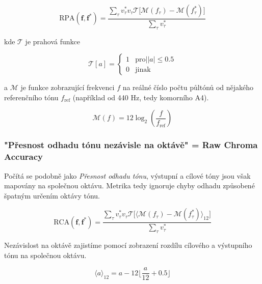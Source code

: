     $$\mathrm{RPA}(\mathbf{f}, \mathbf{f^*}) = \frac{\sum_\tau{v^*_\tau v_\tau \mathcal{T}[\mathcal{M}(f_\tau) - \mathcal{M}(f^*_\tau)}] }{\sum_\tau{v^*_\tau}}$$

kde $\mathcal{T}$ je prahová funkce

    \begin{equation*}
        \mathcal{T}[a] = \begin{cases}
                1 & \mathrm{pro} \lvert |a| \le 0.5 \\
                0 & \text{jinak}
                
            \end{cases}
    \end{equation*}

a $\mathcal{M}$ je funkce zobrazující frekvenci $f$ na reálné číslo počtu půltónů od nějakého referenčního tónu $f_{\mathrm{ref}}$ (například od 440 Hz, tedy komorního A4).

    $$\mathcal{M}(f) = 12 \log_2(\frac{f}{f_{\mathrm{ref}}})$$





\subsubsection{"Přesnost odhadu tónu nezávisle na oktávě" = Raw Chroma Accuracy}

Počítá se podobně jako \textit{Přesnost odhadu tónu}, výstupní a cílové tóny jsou však mapovány na společnou oktávu. Metrika tedy ignoruje chyby odhadu způsobené špatným určením oktávy tónu.

    $$\mathrm{RCA}(\mathbf{f}, \mathbf{f^*}) = \frac{\sum_\tau{v^*_\tau v_\tau \mathcal{T}[\langle \mathcal{M}(f_\tau) - \mathcal{M}(f^*_\tau)} \rangle_{12}] }{\sum_\tau{v^*_\tau}}$$

Nezávislost na oktávě zajistíme pomocí zobrazení rozdílu cílového a výstupního tónu na společnou oktávu.

    $$\langle a \rangle_{12} = a - 12 \lfloor \frac{a}{12} + 0.5 \rfloor  $$





